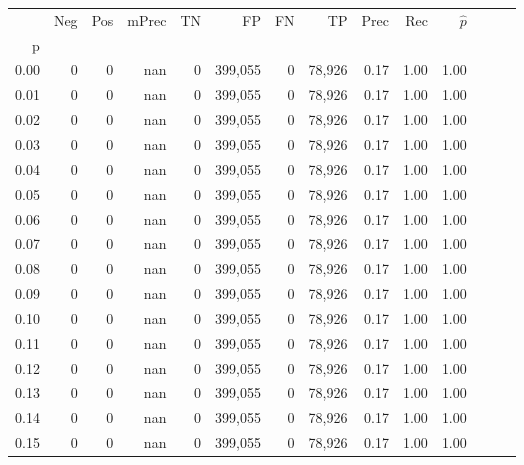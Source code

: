 \begin{tabular}{rrrrrrrrrrrrrr}
\toprule
{} &      Neg &     Pos & mPrec &       TN &       FP &      FN &      TP &  Prec &   Rec & $\hat{p}$ \\
p    &          &         &       &          &          &         &         &       &       &           \\
\midrule
0.00 &        0 &       0 &   nan &        0 &  399,055 &       0 &  78,926 &  0.17 &  1.00 &      1.00 \\
0.01 &        0 &       0 &   nan &        0 &  399,055 &       0 &  78,926 &  0.17 &  1.00 &      1.00 \\
0.02 &        0 &       0 &   nan &        0 &  399,055 &       0 &  78,926 &  0.17 &  1.00 &      1.00 \\
0.03 &        0 &       0 &   nan &        0 &  399,055 &       0 &  78,926 &  0.17 &  1.00 &      1.00 \\
0.04 &        0 &       0 &   nan &        0 &  399,055 &       0 &  78,926 &  0.17 &  1.00 &      1.00 \\
0.05 &        0 &       0 &   nan &        0 &  399,055 &       0 &  78,926 &  0.17 &  1.00 &      1.00 \\
0.06 &        0 &       0 &   nan &        0 &  399,055 &       0 &  78,926 &  0.17 &  1.00 &      1.00 \\
0.07 &        0 &       0 &   nan &        0 &  399,055 &       0 &  78,926 &  0.17 &  1.00 &      1.00 \\
0.08 &        0 &       0 &   nan &        0 &  399,055 &       0 &  78,926 &  0.17 &  1.00 &      1.00 \\
0.09 &        0 &       0 &   nan &        0 &  399,055 &       0 &  78,926 &  0.17 &  1.00 &      1.00 \\
0.10 &        0 &       0 &   nan &        0 &  399,055 &       0 &  78,926 &  0.17 &  1.00 &      1.00 \\
0.11 &        0 &       0 &   nan &        0 &  399,055 &       0 &  78,926 &  0.17 &  1.00 &      1.00 \\
0.12 &        0 &       0 &   nan &        0 &  399,055 &       0 &  78,926 &  0.17 &  1.00 &      1.00 \\
0.13 &        0 &       0 &   nan &        0 &  399,055 &       0 &  78,926 &  0.17 &  1.00 &      1.00 \\
0.14 &        0 &       0 &   nan &        0 &  399,055 &       0 &  78,926 &  0.17 &  1.00 &      1.00 \\
0.15 &        0 &       0 &   nan &        0 &  399,055 &       0 &  78,926 &  0.17 &  1.00 &      1.00 \\

\end{tabular}
